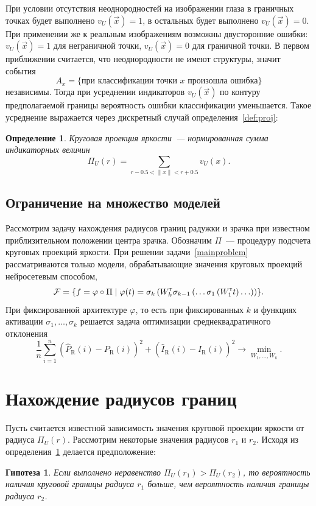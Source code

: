 \documentclass[12pt, twoside]{article}
\newtheorem{hop}{Гипотеза}
\newtheorem{definition}{Определение}
\begin{document}
При условии отсутствия неоднородностей на изображении глаза в граничных точках будет выполнено $v_U(\vec{x})=1$, в остальных будет выполнено $v_U(\vec{x})=0$. При применении же к реальным изображениям возможны двусторонние ошибки: $v_U(\vec{x})=1$ для неграничной точки, $v_U(\vec{x})=0$ для граничной точки. В первом приближении считается, что неоднородности не имеют структуры, значит события 
\[
A_x = \{\text{при классификации точки }x\text{ произошла ошибка}\}
\]
независимы. Тогда при усреднении индикаторов $v_U(\vec{x})$ по контуру предполагаемой границы вероятность ошибки классификации уменьшается. Такое усреднение выражается через дискретный случай определения~\ref{def:proj}:
\begin{definition}\label{def:proj_sum}
\emph{Круговая проекция яркости}~--- нормированная сумма индикаторных величин
\[
\Pi_U(r) = \sum_{r-0.5 < \|x\|<r+0.5} v_U(x).
\] 
\end{definition}

\subsection{Ограничение на множество моделей}

Рассмотрим задачу нахождения радиусов границ радужки и зрачка при известном приблизительном положении центра зрачка. Обозначим $\Pi$~--- процедуру подсчета круговых проекций яркости. При решении задачи~\eqref{mainproblem} рассматриваются только модели, обрабатывающие значения круговых проекций нейросетевым способом,
\[
\mathcal{F} = \left\{f = \varphi \circ \Pi \mid \varphi(t) = \sigma_k\left(W_k^{\text{\tiny\sffamily\upshape\mdseries T}} \sigma_{k-1}\left(\ldots \sigma_1\left(W_1^{\text{\tiny\sffamily\upshape\mdseries T}} t\right)\ldots\right)\right)\right\}\!.
\]
При фиксированной архитектуре $\varphi$, то есть при фиксированных $k$ и функциях активации $\sigma_1, \ldots, \sigma_k$ решается задача оптимизации среднеквадратичного отклонения
\begin{equation}\label{secondproblem}
\frac{1}{n}\sum_{i=1}^n \left(\widehat{P}_\text{R}(i) - P_\text{R}(i)\right)^2 + \left(\widehat{I}_\text{R}(i) - I_\text{R}(i)\right)^2 \to \min_{W_1, \ldots, W_k}.
\end{equation}

\section{Нахождение радиусов границ}

Пусть считается известной зависимость значения круговой проекции яркости от радиуса $\Pi_U(r)$. Рассмотрим некоторые значения радиусов $r_1$ и $r_2$. Исходя из определения~\ref{def:proj_sum} делается предположение:
\begin{hop}
Если выполнено неравенство $\Pi_U(r_1) > \Pi_U(r_2)$, то вероятность наличия круговой границы радиуса $r_1$ больше, чем вероятность наличия границы радиуса $r_2$.
\end{hop}
\end{document}
